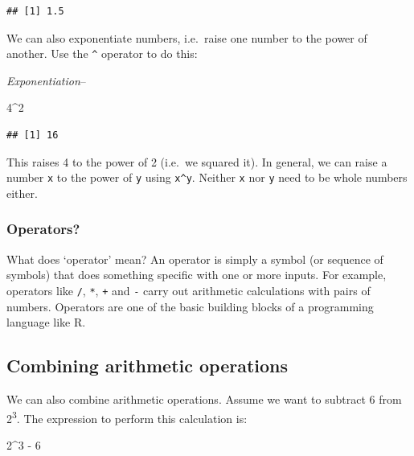 \documentclass[
]{book}
\newenvironment{Shaded}{\begin{snugshade}}{\end{snugshade}}
\newcommand{\DecValTok}[1]{\textcolor[rgb]{0.00,0.00,0.81}{#1}}
\newcommand{\SpecialCharTok}[1]{\textcolor[rgb]{0.00,0.00,0.00}{#1}}
\newenvironment{greybox}{
  \definecolor{shadecolor}{rgb}{0.95,0.95,0.95}  %
  \color{black}
  \begin{shaded}}
 {\end{shaded}}
\newenvironment{infobox}[1]
  {
  \begin{itemize}
  \renewcommand{\labelitemi}{
    \raisebox{-.7\height}[0pt][0pt]{
      {\setkeys{Gin}{width=3em,keepaspectratio}
        \texttt{[image: images/\#1]}}
    }
  }
  \setlength{\fboxsep}{1em}
  \begin{greybox}
  \item
  }
  {
  \end{greybox}
  \end{itemize}
  }
\begin{document}
\begin{verbatim}
## [1] 1.5
\end{verbatim}

We can also exponentiate numbers, i.e.~raise one number to the power of another. Use the \texttt{\^{}} operator to do this:

\emph{Exponentiation}--

\begin{Shaded}
\begin{Highlighting}[]
\DecValTok{4}\SpecialCharTok{\^{}}\DecValTok{2}
\end{Highlighting}
\end{Shaded}

\begin{verbatim}
## [1] 16
\end{verbatim}

This raises 4 to the power of 2 (i.e.~we squared it). In general, we can raise a number \texttt{x} to the power of \texttt{y} using \texttt{x\^{}y}. Neither \texttt{x} nor \texttt{y} need to be whole numbers either.

\begin{infobox}{information}

\hypertarget{operators}{%
\subsubsection*{Operators?}\label{operators}}

What does `operator' mean? An operator is simply a symbol (or sequence of symbols) that does something specific with one or more inputs. For example, operators like \texttt{/}, \texttt{*}, \texttt{+} and \texttt{-} carry out arithmetic calculations with pairs of numbers. Operators are one of the basic building blocks of a programming language like R.

\end{infobox}

\hypertarget{combining-arithmetic-operations}{%
\subsection{Combining arithmetic operations}\label{combining-arithmetic-operations}}

We can also combine arithmetic operations. Assume we want to subtract 6 from 2\textsuperscript{3}. The expression to perform this calculation is:

\begin{Shaded}
\begin{Highlighting}[]
\DecValTok{2}\SpecialCharTok{\^{}}\DecValTok{3} \SpecialCharTok{{-}} \DecValTok{6}
\end{Highlighting}
\end{Shaded}
\end{document}
